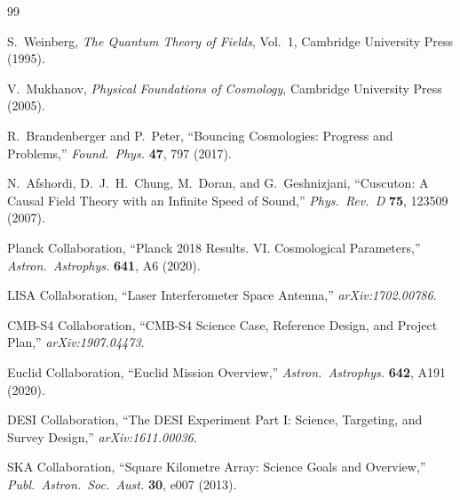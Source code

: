 \documentclass[11pt,a4paper]{article}
\begin{document}
\begin{thebibliography}{99}

S.~Weinberg,
\textit{The Quantum Theory of Fields}, Vol.~1,
Cambridge University Press (1995).

V.~Mukhanov,
\textit{Physical Foundations of Cosmology},
Cambridge University Press (2005).

R.~Brandenberger and P.~Peter,
``Bouncing Cosmologies: Progress and Problems,''
\textit{Found.\ Phys.} \textbf{47}, 797 (2017).

N.~Afshordi, D.~J.~H.~Chung, M.~Doran, and G.~Geshnizjani,
``Cuscuton: A Causal Field Theory with an Infinite Speed of Sound,''
\textit{Phys.\ Rev.\ D} \textbf{75}, 123509 (2007).

Planck Collaboration,
``Planck 2018 Results. VI. Cosmological Parameters,''
\textit{Astron.\ Astrophys.} \textbf{641}, A6 (2020).

LISA Collaboration,
``Laser Interferometer Space Antenna,''
\textit{arXiv:1702.00786}.

CMB-S4 Collaboration,
``CMB-S4 Science Case, Reference Design, and Project Plan,''
\textit{arXiv:1907.04473}.

Euclid Collaboration,
``Euclid Mission Overview,''
\textit{Astron.\ Astrophys.} \textbf{642}, A191 (2020).

DESI Collaboration,
``The DESI Experiment Part I: Science, Targeting, and Survey Design,''
\textit{arXiv:1611.00036}.

SKA Collaboration,
``Square Kilometre Array: Science Goals and Overview,''
\textit{Publ.\ Astron.\ Soc.\ Aust.} \textbf{30}, e007 (2013).

\end{thebibliography}
\end{document}
